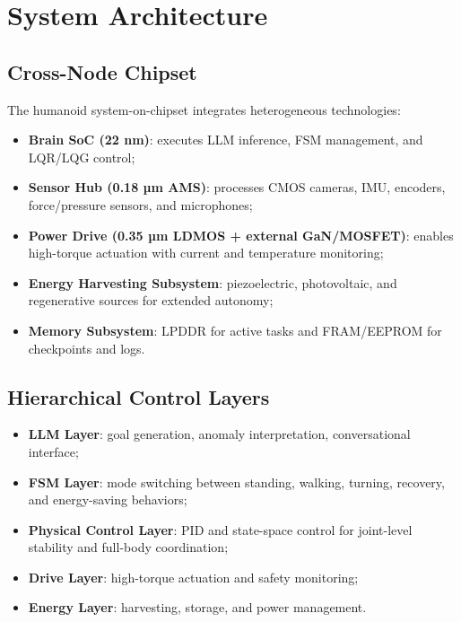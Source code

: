 \section{System Architecture}
\subsection{Cross-Node Chipset}
The humanoid system-on-chipset integrates heterogeneous technologies:
\begin{itemize}
  \item \textbf{Brain SoC (22 nm)}: executes LLM inference, FSM management, and LQR/LQG control;
  \item \textbf{Sensor Hub (0.18 µm AMS)}: processes CMOS cameras, IMU, encoders, force/pressure sensors, and microphones;
  \item \textbf{Power Drive (0.35 µm LDMOS + external GaN/MOSFET)}: enables high-torque actuation with current and temperature monitoring;
  \item \textbf{Energy Harvesting Subsystem}: piezoelectric, photovoltaic, and regenerative sources for extended autonomy;
  \item \textbf{Memory Subsystem}: LPDDR for active tasks and FRAM/EEPROM for checkpoints and logs.
\end{itemize}

\subsection{Hierarchical Control Layers}
\begin{itemize}
  \item \textbf{LLM Layer}: goal generation, anomaly interpretation, conversational interface;
  \item \textbf{FSM Layer}: mode switching between standing, walking, turning, recovery, and energy-saving behaviors;
  \item \textbf{Physical Control Layer}: PID and state-space control for joint-level stability and full-body coordination;
  \item \textbf{Drive Layer}: high-torque actuation and safety monitoring;
  \item \textbf{Energy Layer}: harvesting, storage, and power management.
\end{itemize}

